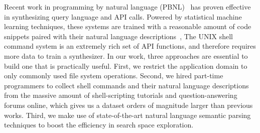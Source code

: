 Recent work in programming by natural language (PBNL)~\cite{DBLP:journals/pvldb/LiJ14,DBLP:journals/corr/DesaiGHJKMRR15,DBLP:conf/acl/QuirkMG15} has proven effective in synthesizing query language and API calls. Powered by statistical machine learning techniques, these systems are trained with a reasonable amount of code snippets paired with their natural language descriptions~\cite{DBLP:conf/mobisys/LeGS13,DBLP:journals/corr/DesaiGHJKMRR15}, The UNIX shell command system is an extremely rich set of API functions, and therefore requires more data to train a synthesizer. In our work, three approaches are essential to build one that is practically useful. First, we restrict the application domain to only commonly used file system operations. Second, we hired part-time programmers to collect shell commands and their natural language descriptions from the massive amount of shell-scripting tutorials and question-answering forums online, which gives us a dataset orders of magnitude larger than previous works. Third, we make use of state-of-the-art natural language semantic parsing techniques to boost the efficiency in search space exploration.


